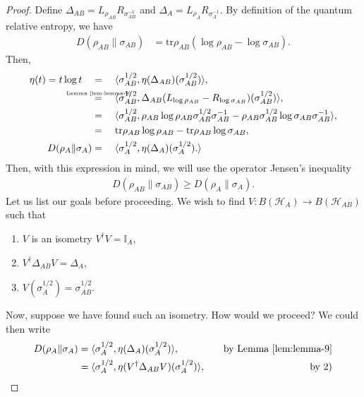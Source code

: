\documentclass[notoc]{tufte-book}
\newcommand\byLemmaNine{\stackrel{\mathclap{\normalfont\mbox{\tiny{Lemma \ref{lem:lemma-9}}}}}{=}}
\begin{document}
\begin{proof}
Define $\Delta_{AB} = L_{\rho_{AB}} R_{\sigma_{AB}^{-1}}$ and $\Delta_A = L_{\rho_A} R_{\sigma_{A}^{-1}}$. By definition of the quantum relative entropy, we have 
\begin{align}
    D(\rho_{AB} \| \sigma_{AB}) &= \text{tr} \rho_{AB}(\log{\rho_{AB}}-\log{\sigma_{AB}}). 
\end{align}
Then,
\begin{align}
    \eta(t)=t\log{t} \quad &= \quad \langle \sigma^{1/2}_{AB},\eta (\Delta_{AB})(\sigma_{AB}^{1/2})\rangle,\\
    &\byLemmaNine \quad \langle \sigma^{1/2}_{AB},\Delta_{AB}(L_{\log{\rho_{AB}}}-R_{\log{\sigma_{AB}}})(\sigma_{AB}^{1/2})\rangle,\\ 
    &= \quad \langle \sigma_{AB}^{1/2}, \rho_{AB} \log{\rho_{AB}} \sigma_{AB}^{1/2} \sigma_{AB}^{-1} - \rho_{AB} \sigma_{AB}^{1/2} \log{\sigma_{AB}} \sigma_{AB}^{-1} \rangle,\\
    &= \quad \text{tr}\rho_{AB} \log{\rho_{AB}}-\text{tr}\rho_{AB}\log{\sigma_{AB}},\\
    D(\rho_A \| \sigma_A)&= \quad \langle \sigma_A^{1/2}, \eta (\Delta_A)(\sigma_A^{1/2}). \rangle
\end{align}
Then, with this expression in mind, we will use the operator Jensen's inequality
\begin{align}
    D(\rho_{AB} \| \sigma_{AB}) \geq D(\rho_{A}\|\sigma_{A}).
\end{align}
Let us list our goals before proceeding. We wish to find $V: B(\mathcal{H}_A) \rightarrow B(\mathcal{H}_{AB})$ such that 
\begin{enumerate}
    \item $V$ is an isometry $V^{\dagger} V = \mathbb{I}_A$,
    \item $V^{\dagger} \Delta_{AB} V = \Delta_A$,
    \item $V(\sigma_A^{1/2}) = \sigma_{AB}^{1/2}$.
\end{enumerate}
Now, suppose we have found such an isometry. How would we proceed? We could then write
\begin{align}
    D(\rho_A \| \sigma_A) &= \langle \sigma_A^{1/2}, \eta(\Delta_A)(\sigma_A^{1/2})\rangle, \quad & \text{by Lemma \ref{lem:lemma-9}}\\ 
    &=\langle \sigma_A^{1/2}, \eta(V^{\dagger} \Delta_{AB} V)(\sigma_A^{1/2}) \rangle, \quad & \text{by 2)} \\

\end{align}
\end{proof}
\end{document}
